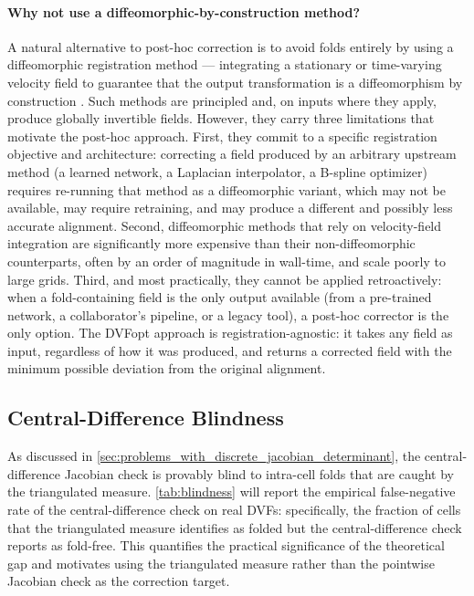 \documentclass[lettersize,journal]{IEEEtran}
\begin{document}
\paragraph{Why not use a diffeomorphic-by-construction method?}
A natural alternative to post-hoc correction is to avoid folds entirely by using a diffeomorphic registration method — integrating a stationary or time-varying velocity field to guarantee that the output transformation is a diffeomorphism by construction \cite{Dalca2018, AVANTS200826}. Such methods are principled and, on inputs where they apply, produce globally invertible fields. However, they carry three limitations that motivate the post-hoc approach. First, they commit to a specific registration objective and architecture: correcting a field produced by an arbitrary upstream method (a learned network, a Laplacian interpolator, a B-spline optimizer) requires re-running that method as a diffeomorphic variant, which may not be available, may require retraining, and may produce a different and possibly less accurate alignment. Second, diffeomorphic methods that rely on velocity-field integration are significantly more expensive than their non-diffeomorphic counterparts, often by an order of magnitude in wall-time, and scale poorly to large grids. Third, and most practically, they cannot be applied retroactively: when a fold-containing field is the only output available (from a pre-trained network, a collaborator's pipeline, or a legacy tool), a post-hoc corrector is the only option. The DVFopt approach is registration-agnostic: it takes any field as input, regardless of how it was produced, and returns a corrected field with the minimum possible deviation from the original alignment.

\subsection{Central-Difference Blindness}
\label{sec:blindness}

As discussed in \autoref{sec:problems_with_discrete_jacobian_determinant}, the central-difference Jacobian check is provably blind to intra-cell folds that are caught by the triangulated measure. \autoref{tab:blindness} will report the empirical false-negative rate of the central-difference check on real DVFs: specifically, the fraction of cells that the triangulated measure identifies as folded but the central-difference check reports as fold-free. This quantifies the practical significance of the theoretical gap and motivates using the triangulated measure rather than the pointwise Jacobian check as the correction target.
\end{document}
